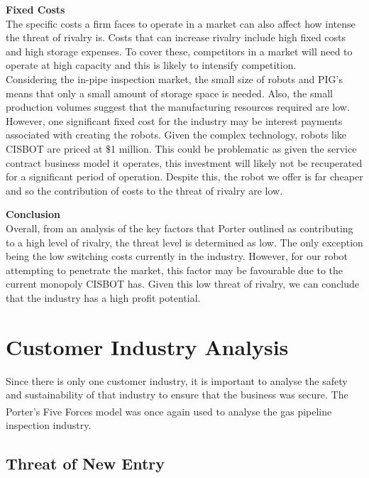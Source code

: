 \documentclass[11pt]{article}		%
\begin{document}
        \textbf{Fixed Costs}\\
        The specific costs a firm faces to operate in a market can also affect how intense the threat of rivalry is. Costs that can increase rivalry include high fixed costs and high storage expenses. To cover these, competitors in a market will need to operate at high capacity and this is likely to intensify competition.\\
        \hspace*{3ex}Considering the in-pipe inspection market, the small size of robots and PIG’s means that only a small amount of storage space is needed. Also, the small production volumes suggest that the manufacturing resources required are low. However, one significant fixed cost for the industry may be interest payments associated with creating the robots. Given the complex technology, robots like CISBOT are priced at \$1 million. This could be problematic as given the service contract business model it operates, this investment will likely not be recuperated for a significant period of operation. Despite this, the robot we offer is far cheaper and so the contribution of costs to the threat of rivalry are low. 
        
        \textbf{Conclusion}\\
        Overall, from an analysis of the key factors that Porter outlined as contributing to a high level of rivalry, the threat level is determined as low. The only exception being the low switching costs currently in the industry. However, for our robot attempting to penetrate the market, this factor may be favourable due to the current monopoly CISBOT has. Given this low threat of rivalry, we can conclude that the industry has a high profit potential.
       
        
        


		
	\section{Customer Industry Analysis}
		Since there is only one customer industry, it is important to analyse the safety and sustainability of that industry to ensure that the business was secure.
		The Porter's Five Forces model\textsuperscript{\cite{porter2008five}} was once again used to analyse the gas pipeline inspection industry.
			
		\subsection[Threat of New Entry]{Threat of New Entry}
				
\end{document}
